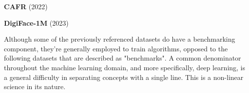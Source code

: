 \documentclass[class=report, crop=false, a4paper, 12pt]{standalone}
\begin{document}
\vspace{0.7\baselineskip}
\noindent\textbf{CAFR} (2022) \autocite{zhaoAgeInvariantFaceRecognition2022}

\vspace{0.7\baselineskip}
\noindent\textbf{DigiFace-1M} (2023)

\vspace{\baselineskip}
\par Although some of the previously referenced datasets do have a benchmarking component, they're generally employed to train algorithms, opposed to the following datasets that are described as "benchmarks". A common denominator throughout the machine learning domain, and more specifically, deep learning, is a general difficulty in separating concepts with a single line. This is a non-linear science in its nature.
\end{document}
